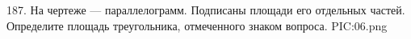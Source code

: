 187. На чертеже --- параллелограмм. Подписаны площади его отдельных частей. Определите площадь треугольника, отмеченного знаком вопроса.
{{PIC:06.png}}\\
